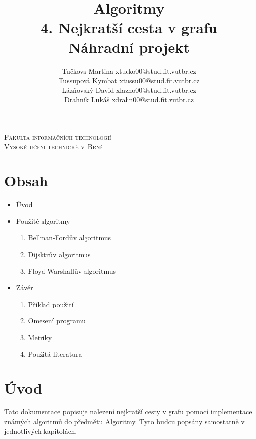 \documentclass[a4paper,11pt]{article}
\begin{document}
\begin{center}
\textsc{\Huge Fakulta informačních technologií\\
Vysoké učení technické v~Brně\\}

\LARGE \title{Algoritmy\\
\textbf{4. Nejkratší cesta v grafu\\}
Náhradní projekt\\}


\hfill \author{Tučková Martina xtucko00@stud.fit.vutbr.cz\\
 Tussupová Kymbat xtussu00@stud.fit.vutbr.cz\\
 Lázňovský David xlazno00@stud.fit.vutbr.cz\\
 Drahník Lukáš xdrahn00@stud.fit.vutbr.cz}
\end{center}


{\let\newpage\relax\maketitle}

\newpage

\section*{Obsah}
\begin{itemize}
  \item Úvod
  \item Použité algoritmy
  \begin{enumerate}
  \item Bellman-Fordův algoritmus
  \item Dijsktrův algoritmus
  \item Floyd-Warshallův algoritmus
  \end{enumerate}
  \item Závěr
  \begin{enumerate}
  \item Příklad použití
  \item Omezení programu
  \item Metriky
  \item Použitá literatura
  \end{enumerate}
\end{itemize}

\newpage

\section*{Úvod}
Tato dokumentace popisuje nalezení nejkratší cesty v grafu pomocí implementace známých algoritmů do předmětu Algoritmy.  Tyto budou popsány samostatně v jednotlivých kapitolách.
\end{document}
